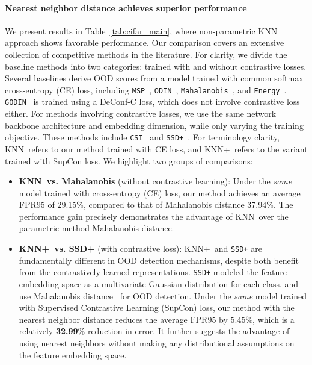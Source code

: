 \documentclass[nohyperref]{article}
\newcommand{\method}{{KNN}}
\newcommand{\methodplus}{{KNN+}}
\theoremstyle{plain}
\theoremstyle{definition}
\theoremstyle{remark}
\begin{document}
\paragraph{Nearest neighbor distance achieves superior performance}
We present results in Table~\ref{tab:cifar_main}, where non-parametric KNN approach shows favorable performance. Our comparison covers an extensive collection of competitive methods in the literature. For clarity, we divide the baseline methods into two categories: trained with and without contrastive losses. Several baselines derive OOD scores from a model trained with common softmax cross-entropy (CE) loss, including \texttt{MSP}~\citep{Kevin}, \texttt{ODIN}~\citep{liang2018enhancing}, \texttt{Mahalanobis}~\citep{lee2018simple}, and \texttt{Energy}~\citep{liu2020energy}. \texttt{GODIN}~\citep{hsu2020generalized} is trained using a DeConf-C loss, which does not involve contrastive loss either. 
For methods involving contrastive losses, we use the same network backbone architecture and embedding dimension, while only varying the training objective. These methods include 
\texttt{CSI}~\citep{tack2020csi} and
\texttt{SSD+}~\citep{2021ssd}. For terminology clarity, \method~refers to our method trained with CE loss, and \methodplus~refers to the variant trained with SupCon loss. We highlight two groups of comparisons: 
\begin{itemize}
\vspace{-0.2cm}
\item \textbf{\method~vs. Mahalanobis} (without contrastive learning): Under the \emph{same} model trained with cross-entropy (CE) loss, our method achieves an average FPR95 of 29.15\%, compared to that of Mahalanobis distance 37.94\%. The performance gain precisely demonstrates the advantage of \method~over the parametric method Mahalanobis distance.
\vspace{-0.2cm}
\item \textbf{\methodplus~vs. SSD+} (with contrastive loss):   \methodplus~and \texttt{SSD+}  are fundamentally different in OOD detection mechanisms, despite both benefit from the contrastively learned representations.  \texttt{SSD+} modeled the feature embedding space as a multivariate Gaussian distribution for each class, and use Mahalanobis distance~\cite{lee2018simple} for OOD detection. Under the \emph{same} model trained with Supervised Contrastive Learning (SupCon) loss, our method with the nearest neighbor distance reduces the average FPR95 by ${5.45}\%$, which is a relatively \textbf{32.99}\% reduction in error. It further suggests the advantage of using nearest neighbors without making any distributional assumptions on the feature embedding space.  

\end{itemize}
\end{document}
